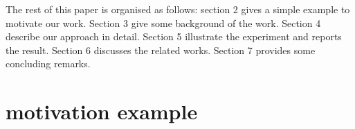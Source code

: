 \documentclass{sig-alternate}
\begin{document}




The rest of this paper is organised as follows:
section 2 gives a simple example to motivate our work. Section 3 give some background of the work. Section 4 describe our approach in detail. Section 5 illustrate the experiment and reports the result. Section 6 discusses the related works. Section 7 provides some concluding remarks.

\section{motivation example}
\end{document}
